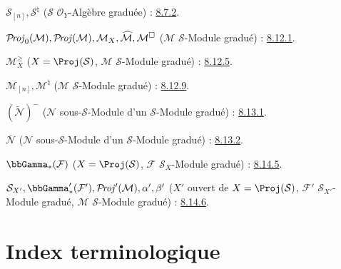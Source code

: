 $\mathcal{S}_{[n]},\mathcal{S}^{\natural}$
($\mathcal{S}$ $\mathcal{O}_Y$-Algèbre graduée) : \hyperref[II.8.7.2-fr]{8.7.2}.

$\mathcal{P}\!\mathit{roj}_0(\mathcal{M}),\mathcal{P}\!\mathit{roj}(\mathcal{M}),\mathcal{M}_X,
\widehat{\mathcal{M}},\mathcal{M}^{\square}$
($\mathcal{M}$ $\mathcal{S}$-Module gradué) : \hyperref[II.8.12.1-fr]{8.12.1}.

$\mathcal{M}_X^\geq$
($X=\Proj(\mathcal{S})$, $\mathcal{M}$ $\mathcal{S}$-Module gradué) : \hyperref[II.8.12.5-fr]{8.12.5}.

$\mathcal{M}_{[n]},\mathcal{M}^{\natural}$
($\mathcal{M}$ $\mathcal{S}$-Module gradué) : \hyperref[II.8.12.9-fr]{8.12.9}.

$(\widetilde{\mathcal{N}})^-$
($\mathcal{N}$ sous-$\mathcal{S}$-Module d'un $\mathcal{S}$-Module gradué) : \hyperref[II.8.13.1-fr]{8.13.1}.

$\overline{\mathcal{N}}$
($\mathcal{N}$ sous-$\mathcal{S}$-Module d'un $\mathcal{S}$-Module gradué) : \hyperref[II.8.13.2-fr]{8.13.2}.

$\bbGamma_*(\mathcal{F})$
($X=\Proj(\mathcal{S})$, $\mathcal{F}$ $\mathcal{S}_X$-Module gradué) : \hyperref[II.8.14.5-fr]{8.14.5}.

$\mathcal{S}_{X'},\bbGamma'_*(\mathcal{F}'),\egaShProj'(\mathcal{M}),
\alpha',\beta'$
($X'$ ouvert de $X=\Proj(\mathcal{S})$, $\mathcal{F}'$ $\mathcal{S}_{X'}$-Module gradué,
$\mathcal{M}$ $\mathcal{S}$-Module gradué) : \hyperref[II.8.14.6-fr]{8.14.6}.

\endgroup

\clearpage
{}
\thispagestyle{plain}
{}
\section*{Index terminologique}

\begingroup
\small
\setlength{\parindent}{0pt}
\setlength{\parskip}{2pt}
\newcommand{\egaTerme}[2]{#1 : #2.\par}

